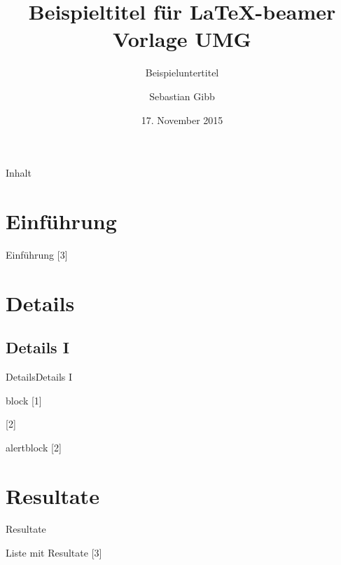 \documentclass{beamer}
\title[Bsp. beamertheme UMG]{Beispieltitel f\"ur \LaTeX-beamer Vorlage UMG}
\subtitle{Beispieluntertitel}
\author{Sebastian Gibb}
\institute[KA, UMG]{Klinik für Anästhesiologie -- Universitätsmedizin Greifswald}
\date[17.11.2015]{17. November 2015}
\begin{document}
\begin{frame}
  \titlepage
\end{frame}

\begin{frame}{Inhalt}
  \tableofcontents
\end{frame}

\section{Einf\"uhrung}
\begin{frame}{Einf\"uhrung}
  [3]
\end{frame}

\section{Details}
\subsection{Details I}
\begin{frame}{Details}{Details I}

  \begin{block}{block}
    [1]
  \end{block}

  \begin{example}
    [2]
  \end{example}

  \begin{alertblock}{alertblock}
    [2]
  \end{alertblock}

\end{frame}

\section{Resultate}
\begin{frame}{Resultate}

  \begin{block}{Liste mit Resultate}
    [3]
  \end{block}

\end{frame}
\end{document}

